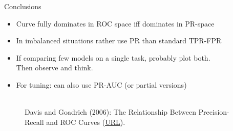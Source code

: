 \documentclass[11pt,compress,t,notes=noshow, xcolor=table]{beamer}
\begin{document}
\begin{vbframe}{Conclusions}

\begin{itemize}
 \item Curve fully dominates in ROC space iff dominates in PR-space
 \item In imbalanced situations rather use PR than standard TPR-FPR
 \item If comparing few models on a single task, probably plot both.\\
 Then observe and think.
\item For tuning: can also use PR-AUC (or partial versions)
\end{itemize}

\vfill

\begin{figure}
  \centering
  \tiny
  \\Davis and Goadrich (2006): The Relationship Between Precision-Recall and
  ROC Curves (\href{https://www.biostat.wisc.edu/~page/rocpr.pdf}
  {\underline{URL}}).
\end{figure}
\end{vbframe}

\endlecture
\end{document}
